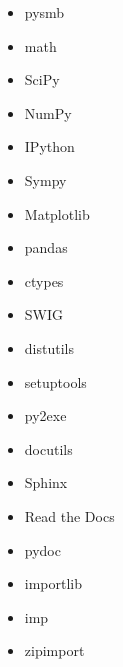 \documentclass{article}
\begin{document}
\begin{enumerate}
\begin{itemize}
            \item pysmb

            \item math
            \item SciPy
            \item NumPy
            \item IPython
            \item Sympy
            \item Matplotlib
            \item pandas

            \item ctypes
            \item SWIG

            \item distutils
            \item setuptools
            \item py2exe

            \item docutils
            \item Sphinx
            \item Read the Docs
            \item pydoc

            \item importlib
            \item imp
            \item zipimport


\end{itemize}
\end{enumerate}
\end{document}
